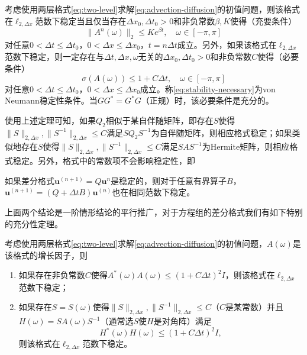 \documentclass[a4paper,10pt]{ctexart}
\begin{document}
\begin{theorem}
    考虑使用两层格式\eqref{eq:two-level}求解\eqref{eq:advection-diffusion}的初值问题，则该格式在$ \ell_{2,\Delta x} $范数下稳定当且仅当存在$ \Delta x_0,\Delta t_0>0 $和非负常数$ \beta,K $使得（充要条件）
    \begin{equation}
        \| A^n(\omega) \|_2 \leqslant K e^{\beta t},\quad \omega\in [-\pi,\pi]
    \end{equation}
    对任意$ 0 < \Delta t\leqslant \Delta t_0 $，$ 0<\Delta x\leqslant \Delta x_0 $，$ t=n\Delta t $成立。另外，如果该格式在$ \ell_{2,\Delta x} $范数下稳定，则一定存在与$ \Delta t,\Delta x,\omega $无关的$ \Delta x_0,\Delta t_0>0 $和非负常数$ C $使得（必要条件）
    \begin{equation}\label{eq:stability-necessary}
        \sigma(A(\omega)) \leqslant 1+C\Delta t,\quad \omega\in [-\pi,\pi]
    \end{equation}
    对任意$ 0 < \Delta t\leqslant \Delta t_0 $，$ 0<\Delta x\leqslant \Delta x_0 $成立。称\eqref{eq:stability-necessary}为von Neumann稳定性条件。当$ GG^*=G^*G $（正规）时，该必要条件是充分的。
\end{theorem}
使用上述定理可知，如果$ Q_2 $相似于某自伴随矩阵，即存在$ S $使得$ \| S \|_{2,\Delta x},\| S^{-1} \|_{2,\Delta x}\leqslant C  $满足$ SQ_2S^{-1} $为自伴随矩阵，则相应格式稳定；如果类似地存在$ S $使得$ \| S \|_{2,\Delta x},\| S^{-1} \|_{2,\Delta x}\leqslant C  $满足$ SAS^{-1} $为Hermite矩阵，则相应格式稳定。另外，格式中的常数项不会影响稳定性，即
\begin{proposition}
    如果差分格式$ \bm{u}^{(n+1)} = Q \bm{u}^{n} $是稳定的，则对于任意有界算子$ B $，$ \bm{u}^{(n+1)} = (Q+\Delta t B)\bm{u}^{(n)} $也在相同范数下稳定。
\end{proposition}

上面两个结论是一阶情形结论的平行推广，对于方程组的差分格式我们有如下特别的充分性定理。
\begin{theorem}\label{th:SystemStability}
    考虑使用两层格式\eqref{eq:two-level}求解\eqref{eq:advection-diffusion}的初值问题，$ A(\omega) $是该格式的增长因子，则
    \begin{enumerate}
        \item 如果存在非负常数$ C $使得$ A^*(\omega)A(\omega)\leqslant (1+C \Delta t)^2 I $，则该格式在$ \ell_{2,\Delta x} $范数下稳定；
        \item 如果存在$ S=S(\omega) $使得$ \| S \|_{2,\Delta x},\| S^{-1} \|_{2,\Delta x}\leqslant C  $（$ C $是某常数）并且$ H(\omega) = SA(\omega)S^{-1} $（通常选$ S $使$ H $是对角阵）满足
        \begin{equation}
            H^*(\omega)H(\omega) \leqslant (1+C\Delta t)^2 I,
        \end{equation}
        则该格式在$ \ell_{2,\Delta x} $范数下稳定。
    \end{enumerate}
\end{theorem}
\end{document}
